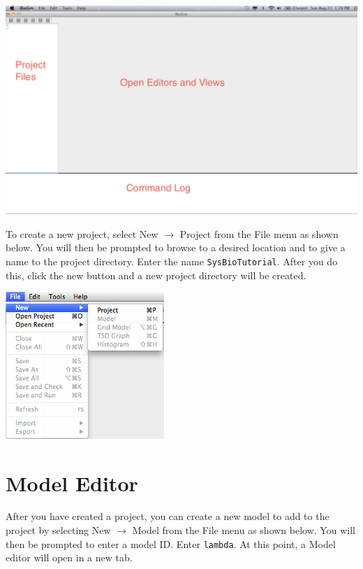 \documentclass[titlepage,11pt]{article}
\begin{document}
\begin{center}
\includegraphics[width=160mm]{screenshots/iBioSim}
\end{center}

\noindent
To create a new project, select New $\rightarrow$ Project from the File menu as shown below.  You will then be prompted to browse to a desired location and to give a name to the project directory.  Enter the name {\tt SysBioTutorial}.  After you do this, click the new button and a new project directory will be created.  

\begin{center}
\includegraphics[width=60mm]{screenshots/project}
\end{center}

\section{Model Editor}

\noindent
After you have created a project, you can create a new model to add to the project by selecting New $\rightarrow$ Model from the File menu as shown below. You will then be prompted to enter a model ID.  Enter {\tt lambda}.  At this point, a Model editor will open in a new tab.
\end{document}
